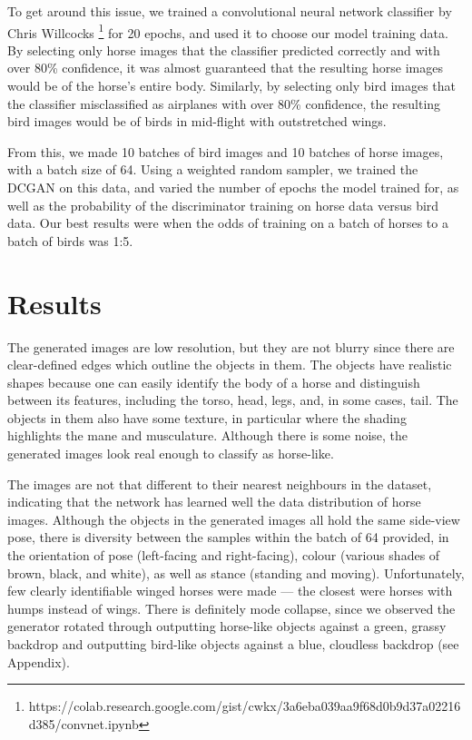 \documentclass{article}
\begin{document}
To get around this issue, we trained a convolutional neural network classifier by Chris Willcocks \footnote{https://colab.research.google.com/gist/cwkx/3a6eba039aa9f68d0b9d37a02216d385/convnet.ipynb} for 20 epochs, and used it to choose our model training data. By selecting only horse images that the classifier predicted correctly and with over 80\% confidence, it was almost guaranteed that the resulting horse images would be of the horse's entire body. Similarly, by selecting only bird images that the classifier misclassified as airplanes with over 80\% confidence, the resulting bird images would be of birds in mid-flight with outstretched wings.  

From this, we made 10 batches of bird images and 10 batches of horse images, with a batch size of 64. Using a weighted random sampler, we trained the DCGAN on this data, and varied the number of epochs the model trained for, as well as the probability of the discriminator training on horse data versus bird data. Our best results were when the odds of training on a batch of horses to a batch of birds was 1:5.

\section{Results}
The generated images are low resolution, but they are not blurry since there are clear-defined edges which outline the objects in them. The objects have realistic shapes because one can easily identify the body of a horse and distinguish between its features, including the torso, head, legs, and, in some cases, tail. The objects in them also have some texture, in particular where the shading highlights the mane and musculature. Although there is some noise, the generated images look real enough to classify as horse-like. 

The images are not that different to their nearest neighbours in the dataset, indicating that the network has learned well the data distribution of horse images. Although the objects in the generated images all hold the same side-view pose, there is diversity between the samples within the batch of 64 provided, in the orientation of pose (left-facing and right-facing), colour (various shades of brown, black, and white), as well as stance (standing and moving). Unfortunately, few clearly identifiable winged horses were made --- the closest were horses with humps instead of wings. There is definitely mode collapse, since we observed the generator rotated through outputting horse-like objects against a green, grassy backdrop and outputting bird-like objects against a blue, cloudless backdrop (see Appendix). 
\end{document}
